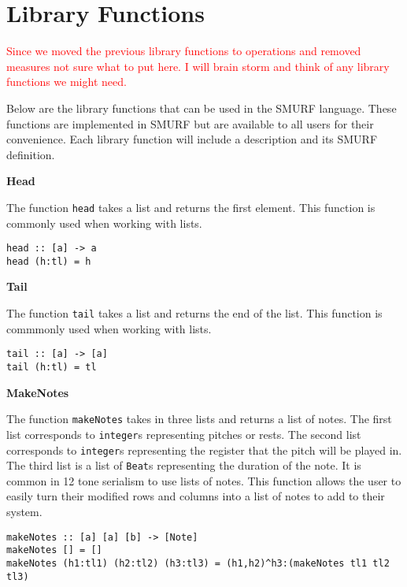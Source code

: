 \section{Library Functions}

\textcolor{red}{Since we moved the previous library functions to operations and removed measures not sure what to put here. I will brain storm and 
think of any library functions we might need.} 


Below are the library functions that can be used in the SMURF language. 
These functions are implemented in SMURF but are available to all users 
for their convenience. Each library function will include a description 
and its SMURF definition. \newline

\noindent\textbf{Head}

The function \texttt{head} takes a list and returns the first element. 
This function is commonly used when working with lists. 

\begin{verbatim}
head :: [a] -> a
head (h:tl) = h
\end{verbatim} 


\noindent\textbf{Tail}

The function \texttt{tail} takes a list and returns the end of the list.
This function is commmonly used when working with lists. 

\begin{verbatim}
tail :: [a] -> [a]
tail (h:tl) = tl
\end{verbatim}

\noindent\textbf{MakeNotes}

The function \texttt{makeNotes} takes in three lists and returns a list 
of notes. The first list corresponds to \texttt{integer}s representing 
pitches or rests. The second list corresponds to \texttt{integer}s representing the register that the pitch will be played in. The third list is a list 
of \texttt{Beat}s representing the duration of the note. It is common in 
12 tone serialism to use lists of notes. This function allows the user 
to easily turn their modified rows and columns into a list of notes to add 
to their system. 

\begin{verbatim}
makeNotes :: [a] [a] [b] -> [Note]
makeNotes [] = []
makeNotes (h1:tl1) (h2:tl2) (h3:tl3) = (h1,h2)^h3:(makeNotes tl1 tl2 tl3)
\end{verbatim}
